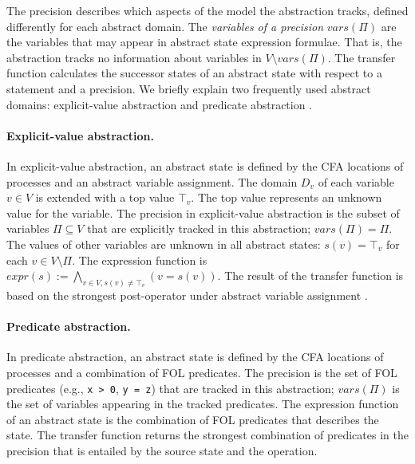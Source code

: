 \documentclass[numbook]{svjour3}
\begin{document}
The precision describes which aspects of the model the abstraction tracks, defined differently for each abstract domain. The \emph{variables of a precision} ${vars}(\Pi)$ are the variables that may appear in abstract state expression formulae. That is, the abstraction tracks no information about variables in $V \setminus {vars}(\Pi)$. The transfer function calculates the successor states of an abstract state with respect to a statement and a precision. We briefly explain two frequently used abstract domains: explicit-value abstraction \cite{beyer_explicit_value_abstraction} and predicate abstraction \cite{flanagan_predicate_abstraction}.

\paragraph*{Explicit-value abstraction.}\quad In explicit-value abstraction, an abstract state is defined by the CFA locations of processes and an abstract variable assignment. The domain $D_v$ of each variable $v \in V$ is extended with a top value $\top_v$. The top value represents an unknown value for the variable. The precision in explicit-value abstraction is the subset of variables $\Pi \subseteq V$ that are explicitly tracked in this abstraction; ${vars}(\Pi) = \Pi$. The values of other variables are unknown in all abstract states: $s(v) = \top_v$ for each $v \in V \setminus \Pi$. The expression function is ${expr}(s) := \bigwedge_{v \in V, s(v) \ne \top_v} (v = s(v))$. The result of the transfer function is based on the strongest post-operator under abstract variable assignment \cite{beyer_explicit_value_abstraction}.

\paragraph*{Predicate abstraction.}\quad In predicate abstraction, an abstract state is defined by the CFA locations of processes and a combination of FOL predicates. The precision is the set of FOL predicates (e.g., \texttt{x > 0}, \texttt{y = z}) that are tracked in this abstraction; ${vars}(\Pi)$ is the set of variables appearing in the tracked predicates. The expression function of an abstract state is the combination of FOL predicates that describes the state. The transfer function returns the strongest combination of predicates in the precision that is entailed by the source state and the operation.
\end{document}
